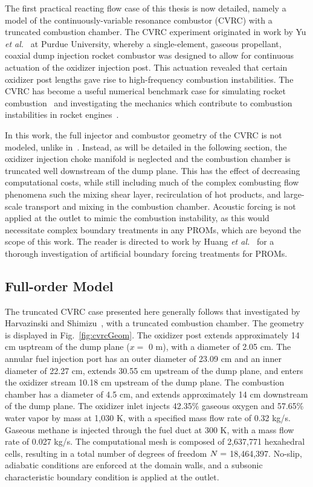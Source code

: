 

The first practical reacting flow case of this thesis is now detailed, namely a model of the continuously-variable resonance combustor (CVRC) with a truncated combustion chamber. The CVRC experiment originated in work by Yu \textit{et al.}~\cite{Yu2008,Yu2009,Yu2012} at Purdue University, whereby a single-element, gaseous propellant, coaxial dump injection rocket combustor was designed to allow for continuous actuation of the oxidizer injection post. This actuation revealed that certain oxidizer post lengths gave rise to high-frequency combustion instabilities. The CVRC has become a useful numerical benchmark case for simulating rocket combustion~\cite{Garby2013,Nguyen2018} and investigating the mechanics which contribute to combustion instabilities in rocket engines~\cite{HarvazinskiCVRCOrig,Harvazinski2016,HarvazinskiCVRCflamelet}.

In this work, the full injector and combustor geometry of the CVRC is not modeled, unlike in~\cite{HarvazinskiCVRCOrig}. Instead, as will be detailed in the following section, the oxidizer injection choke manifold is neglected and the combustion chamber is truncated well downstream of the dump plane. This has the effect of decreasing computational costs, while still including much of the complex combusting flow phenomena such the mixing shear layer, recirculation of hot products, and large-scale transport and mixing in the combustion chamber. Acoustic forcing is not applied at the outlet to mimic the combustion instability, as this would necessitate complex boundary treatments in any PROMs, which are beyond the scope of this work. The reader is directed to work by Huang \textit{et al.}~\cite{Huang2022a} for a thorough investigation of artificial boundary forcing treatments for PROMs.

\subsection{Full-order Model}

The truncated CVRC case presented here generally follows that investigated by Harvazinski and Shimizu~\cite{HarvazinskiCVRCflamelet}, with a truncated combustion chamber. The geometry is displayed in Fig.~\ref{fig:cvrcGeom}. The oxidizer post extends approximately 14 cm usptream of the dump plane ($x = $ 0 m), with a diameter of 2.05 cm. The annular fuel injection port has an outer diameter of 23.09 cm and an inner diameter of 22.27 cm, extends 30.55 cm upstream of the dump plane, and enters the oxidizer stream 10.18 cm upstream of the dump plane. The combustion chamber has a diameter of 4.5 cm, and extends approximately 14 cm downstream of the dump plane. The oxidizer inlet injects 42.35\% gaseous oxygen and 57.65\% water vapor by mass at 1,030 K, with a specified mass flow rate of 0.32 kg/s. Gaseous methane is injected through the fuel duct at 300 K, with a mass flow rate of 0.027 kg/s. The computational mesh is composed of 2,637,771 hexahedral cells, resulting in a total number of degrees of freedom $N =$ 18,464,397. No-slip, adiabatic conditions are enforced at the domain walls, and a subsonic characteristic boundary condition is applied at the outlet.

